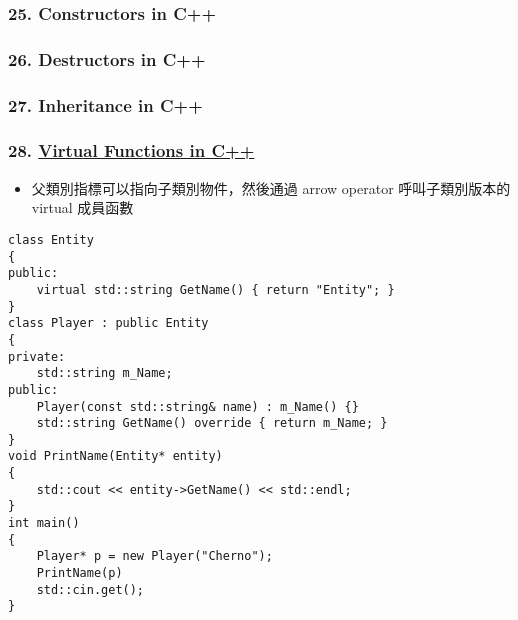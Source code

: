 \documentclass[11pt]{article}
\providecommand{\tightlist}{%
      \setlength{\itemsep}{0pt}\setlength{\parskip}{0pt}}
\begin{document}
\hypertarget{constructors-in-c}{%
\subsubsection{25. Constructors in C++}\label{constructors-in-c}}

\hypertarget{destructors-in-c}{%
\subsubsection{26. Destructors in C++}\label{destructors-in-c}}

\hypertarget{inheritance-in-c}{%
\subsubsection{27. Inheritance in C++}\label{inheritance-in-c}}

\hypertarget{virtual-functions-in-c}{%
\subsubsection{\texorpdfstring{28.
\href{https://www.youtube.com/watch?v=oIV2KchSyGQ\&list=PLlrATfBNZ98dudnM48yfGUldqGD0S4FFb\&index=29\&t=0s}{Virtual
Functions in
C++}}{28. Virtual Functions in C++}}\label{virtual-functions-in-c}}

\begin{itemize}
\tightlist
\item
  父類別指標可以指向子類別物件，然後通過 arrow operator 呼叫子類別版本的
  virtual 成員函數
\end{itemize}

\begin{verbatim}
class Entity
{
public: 
    virtual std::string GetName() { return "Entity"; }
}
class Player : public Entity
{
private:
    std::string m_Name;
public:
    Player(const std::string& name) : m_Name() {}
    std::string GetName() override { return m_Name; }
}
void PrintName(Entity* entity)
{
    std::cout << entity->GetName() << std::endl;
}
int main()
{
    Player* p = new Player("Cherno");
    PrintName(p)
    std::cin.get();
}
\end{verbatim}
\end{document}

